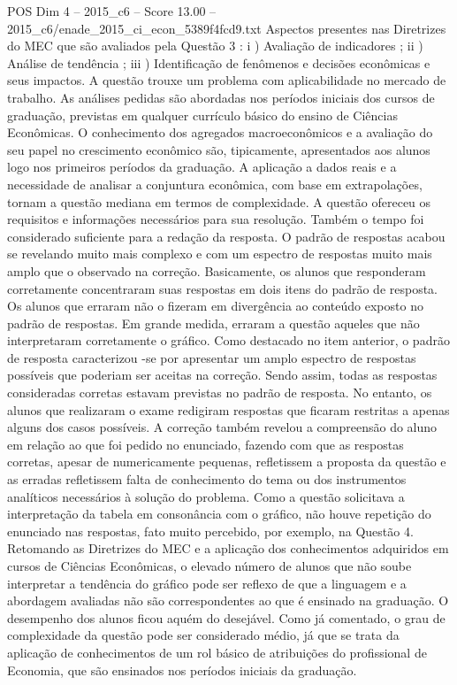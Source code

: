 \begin{textsample}{POS Dim 4 – 2015\_c6 – Score 13.00 – 2015\_c6/enade\_2015\_ci\_econ\_5389f4fcd9.txt}
Aspectos presentes nas Diretrizes do MEC que são avaliados pela Questão 3 : i ) Avaliação de indicadores ; ii ) Análise de tendência ; iii ) Identificação de fenômenos e decisões econômicas e seus impactos.
A questão trouxe um problema com aplicabilidade no mercado de trabalho.
As análises pedidas são abordadas nos períodos iniciais dos cursos de graduação, previstas em qualquer currículo básico do ensino de Ciências Econômicas.
O conhecimento dos agregados macroeconômicos e a avaliação do seu papel no crescimento econômico são, tipicamente, apresentados aos alunos logo nos primeiros períodos da graduação.
A aplicação a dados reais e a necessidade de analisar a conjuntura econômica, com base em extrapolações, tornam a questão mediana em termos de complexidade.
A questão ofereceu os requisitos e informações necessários para sua resolução.
Também o tempo foi considerado suficiente para a redação da resposta.
O padrão de respostas acabou se revelando muito mais complexo e com um espectro de respostas muito mais amplo que o observado na correção.
Basicamente, os alunos que responderam corretamente concentraram suas respostas em dois itens do padrão de resposta.
Os alunos que erraram não o fizeram em divergência ao conteúdo exposto no padrão de respostas.
Em grande medida, erraram a questão aqueles que não interpretaram corretamente o gráfico.
Como destacado no item anterior, o padrão de resposta caracterizou -se por apresentar um amplo espectro de respostas possíveis que poderiam ser aceitas na correção.
Sendo assim, todas as respostas consideradas corretas estavam previstas no padrão de resposta.
No entanto, os alunos que realizaram o exame redigiram respostas que ficaram restritas a apenas alguns dos casos possíveis.
A correção também revelou a compreensão do aluno em relação ao que foi pedido no enunciado, fazendo com que as respostas corretas, apesar de numericamente pequenas, refletissem a proposta da questão e as erradas refletissem falta de conhecimento do tema ou dos instrumentos analíticos necessários à solução do problema.
Como a questão solicitava a interpretação da tabela em consonância com o gráfico, não houve repetição do enunciado nas respostas, fato muito percebido, por exemplo, na Questão 4.
Retomando as Diretrizes do MEC e a aplicação dos conhecimentos adquiridos em cursos de Ciências Econômicas, o elevado número de alunos que não soube interpretar a tendência do gráfico pode ser reflexo de que a linguagem e a abordagem avaliadas não são correspondentes ao que é ensinado na graduação.
O desempenho dos alunos ficou aquém do desejável.
Como já comentado, o grau de complexidade da questão pode ser considerado médio, já que se trata da aplicação de conhecimentos de um rol básico de atribuições do profissional de Economia, que são ensinados nos períodos iniciais da graduação.

\end{textsample}
